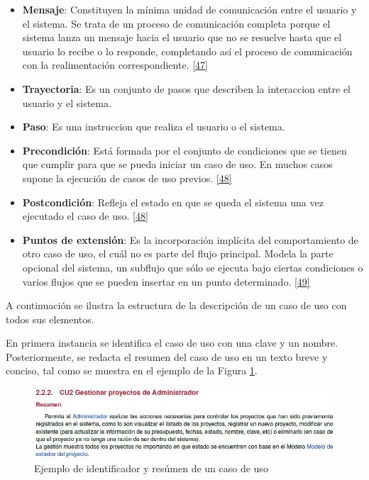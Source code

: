 \begin{itemize}
\item \textbf{Mensaje}: Constituyen la mínima unidad de comunicación entre el usuario y el sistema. Se trata de un proceso de comunicación completa porque el sistema lanza un mensaje hacia el usuario que no se resuelve hasta que el usuario lo recibe o lo responde, completando así el proceso de comunicación con la realimentación correspondiente. \hyperlink{b47}{[47]}

\item \textbf{Trayectoria}: Es un conjunto de pasos que describen la interaccion entre el usuario y el sistema.

\item \textbf{Paso}: Es una instruccion que realiza el usuario o el sistema.

\item \textbf{Precondición}: Está formada por el conjunto de condiciones que se tienen que cumplir para que se pueda iniciar un caso de uso. En muchos casos supone la ejecución de casos de uso previos. \hyperlink{b48}{[48]}

\item \textbf{Postcondición}: Refleja el estado en que se queda el sistema una vez ejecutado el caso de uso. \hyperlink{b48}{[48]}

\item \textbf{Puntos de extensión}: Es la incorporación implícita del comportamiento de otro caso de uso, el cuál no es parte del flujo principal. Modela la parte opcional del sistema, un subflujo que sólo se ejecuta bajo ciertas condiciones o varios flujos que se pueden insertar en un punto determinado. \hyperlink{b49}{[49]}
\end{itemize}

A continuación se ilustra la estructura de la descripción de un caso de uso con todos sus elementos.

En primera instancia se identifica el caso de uso con una clave y un nombre. Posteriormente, se redacta el resumen del caso de uso en un texto breve y conciso, tal como se muestra en el ejemplo de la Figura \ref{fig:resu}.

\begin{figure}[H]
	\begin{center}
		\includegraphics[width=1\textwidth]{images/marcoteorico/resumen}
		\caption{Ejemplo de identificador y resúmen de un caso de uso}
		\label{fig:resu}
	\end{center}
\end{figure}

